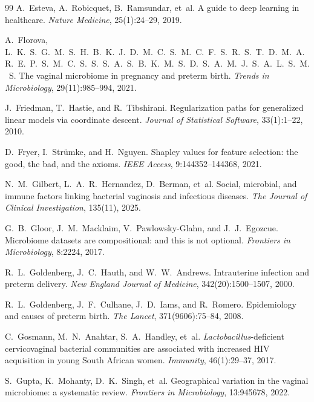 \documentclass[12pt,a4paper]{report}
\begin{document}
\begin{thebibliography}{99}
A.~Esteva, A.~Robicquet, B.~Ramsundar, et~al.
\newblock A guide to deep learning in healthcare.
\newblock \textit{Nature Medicine}, 25(1):24--29, 2019.

A.~Florova, L.~K.~S.~G.~M.~S.~H.~B.~K.~J.~D.~M.~C.~S.~M.~C.~F.~S.~R.~S.~T.~D.~M.~A.~R.~E.~P.~S.~M.~C.~S.~S.~S.~A.~S.~B.~K.~M.~S.~D.~S.~A.~M.~J.~S.~A.~L.~S.~M.~S.
\newblock The vaginal microbiome in pregnancy and preterm birth.
\newblock \textit{Trends in Microbiology}, 29(11):985--994, 2021.

J.~Friedman, T.~Hastie, and R.~Tibshirani.
\newblock Regularization paths for generalized linear models via coordinate descent.
\newblock \textit{Journal of Statistical Software}, 33(1):1--22, 2010.

D.~Fryer, I.~Str\"umke, and H.~Nguyen.
\newblock Shapley values for feature selection: the good, the bad, and the axioms.
\newblock \textit{IEEE Access}, 9:144352--144368, 2021.

N.~M.~Gilbert, L.~A.~R.~Hernandez, D.~Berman, et~al.
\newblock Social, microbial, and immune factors linking bacterial vaginosis and infectious diseases.
\newblock \textit{The Journal of Clinical Investigation}, 135(11), 2025.

G.~B.~Gloor, J.~M.~Macklaim, V.~Pawlowsky-Glahn, and J.~J.~Egozcue.
\newblock Microbiome datasets are compositional: and this is not optional.
\newblock \textit{Frontiers in Microbiology}, 8:2224, 2017.

R.~L.~Goldenberg, J.~C.~Hauth, and W.~W.~Andrews.
\newblock Intrauterine infection and preterm delivery.
\newblock \textit{New England Journal of Medicine}, 342(20):1500--1507, 2000.

R.~L.~Goldenberg, J.~F.~Culhane, J.~D.~Iams, and R.~Romero.
\newblock Epidemiology and causes of preterm birth.
\newblock \textit{The Lancet}, 371(9606):75--84, 2008.

C.~Gosmann, M.~N.~Anahtar, S.~A.~Handley, et~al.
\newblock \textit{Lactobacillus}-deficient cervicovaginal bacterial communities are associated with increased HIV acquisition in young South African women.
\newblock \textit{Immunity}, 46(1):29--37, 2017.

S.~Gupta, K.~Mohanty, D.~K.~Singh, et~al.
\newblock Geographical variation in the vaginal microbiome: a systematic review.
\newblock \textit{Frontiers in Microbiology}, 13:945678, 2022.


\end{thebibliography}
\end{document}
